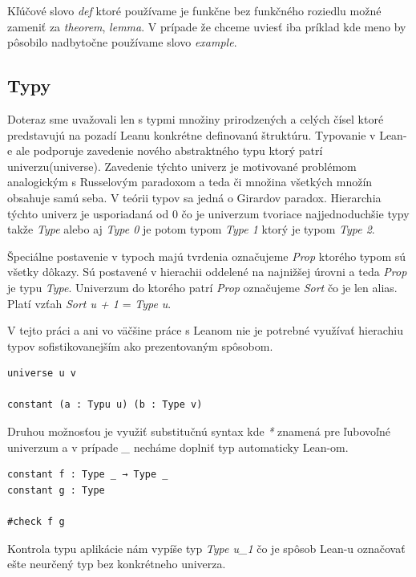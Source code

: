 \documentclass[a4paper,10pt,oneside]{report}%
\begin{document}
    Kľúčové slovo \emph{def} ktoré používame je funkčne bez funkčného roziedlu možné
zameniť za \emph{theorem}, \emph{lemma}. V prípade že chceme uviesť iba príklad
kde meno by pôsobilo nadbytočne používame slovo \emph{example}.

\subsection{Typy}
    Doteraz sme uvažovali len s typmi množiny prirodzených a celých čísel
ktoré predstavujú na pozadí Leanu konkrétne definovanú štruktúru.
    Typovanie v Lean-e ale podporuje zavedenie nového abstraktného typu ktorý patrí univerzu(universe).
    Zavedenie týchto univerz je motivované problémom analogickým s Russelovým paradoxom 
a teda či množina všetkých množín obsahuje samú seba.
    V teórii typov sa jedná o Girardov paradox.
    Hierarchia týchto univerz je usporiadaná od 0 čo je univerzum tvoriace najjednoduchšie
typy takže \emph{Type} alebo aj \emph{Type 0} je potom typom \emph{Type 1} ktorý
je typom \emph{Type 2}.

    Špeciálne postavenie v typoch majú tvrdenia označujeme \emph{Prop} ktorého
typom sú všetky dôkazy.
    Sú postavené v hierachii oddelené na najnižšej úrovni a teda \emph{Prop} je 
typu \emph{Type}.
    Univerzum do ktorého patrí \emph{Prop} označujeme \emph{Sort} čo je len 
alias.
Platí vzťah \emph{Sort u + 1} = \emph{Type u}.

V tejto práci a ani vo väčšine práce s Leanom nie je potrebné využívať hierachiu
    typov sofistikovanejším ako prezentovaným spôsobom.
\begin{lstlisting}
universe u v

constant (a : Typu u) (b : Type v)
\end{lstlisting}
Druhou možnosťou je využiť substitučnú syntax kde \emph{*} znamená pre ľubovoľné univerzum
a v prípade \emph{\_} necháme doplniť typ automaticky Lean-om.
\begin{lstlisting}
constant f : Type _ → Type _
constant g : Type

#check f g
\end{lstlisting}
    Kontrola typu aplikácie nám vypíše typ \emph{Type u\_1} čo je spôsob Lean-u označovať
ešte neurčený typ bez konkrétneho univerza.
\end{document}
